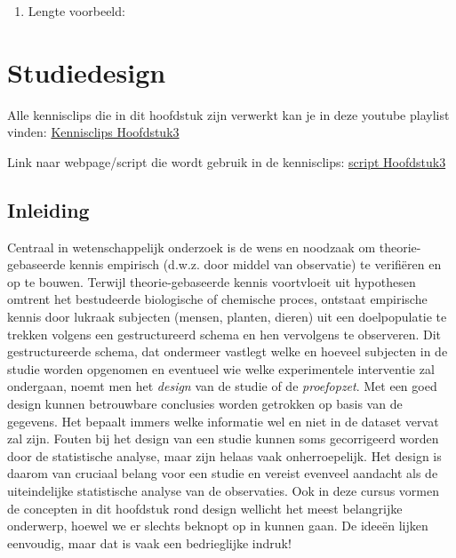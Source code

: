 \documentclass[
  dutch,
  letterpaper,
  12pt]{book}
\providecommand{\tightlist}{%
  \setlength{\itemsep}{0pt}\setlength{\parskip}{0pt}}
\theoremstyle{definition}
\theoremstyle{definition}
\theoremstyle{definition}
\theoremstyle{remark}
\begin{document}
\begin{enumerate}
\def\labelenumi{\arabic{enumi}.}
\setcounter{enumi}{1}
\tightlist
\item
  Lengte voorbeeld:
\end{enumerate}


\chapter{Studiedesign}\label{sec-chap-design}

Alle kennisclips die in dit hoofdstuk zijn verwerkt kan je in deze
youtube playlist vinden:
\href{https://www.youtube.com/playlist?list=PLZH1hP8_LbJL1GjhnpEDlx78OJ6qUzSix}{Kennisclips
Hoofdstuk3}

Link naar webpage/script die wordt gebruik in de kennisclips:
\href{https://statomics.github.io/sbc/rmd/03-experimentalDesign.html}{script
Hoofdstuk3}

\section{Inleiding}\label{inleiding-2}

Centraal in wetenschappelijk onderzoek is de wens en noodzaak om
theorie-gebaseerde kennis empirisch (d.w.z. door middel van observatie)
te verifiëren en op te bouwen. Terwijl theorie-gebaseerde kennis
voortvloeit uit hypothesen omtrent het bestudeerde biologische of
chemische proces, ontstaat empirische kennis door lukraak subjecten
(mensen, planten, dieren) uit een doelpopulatie te trekken volgens een
gestructureerd schema en hen vervolgens te observeren. Dit
gestructureerde schema, dat ondermeer vastlegt welke en hoeveel
subjecten in de studie worden opgenomen en eventueel wie welke
experimentele interventie zal ondergaan, noemt men het \emph{design} van
de studie of de \emph{proefopzet}. Met een goed design kunnen
betrouwbare conclusies worden getrokken op basis van de gegevens. Het
bepaalt immers welke informatie wel en niet in de dataset vervat zal
zijn. Fouten bij het design van een studie kunnen soms gecorrigeerd
worden door de statistische analyse, maar zijn helaas vaak
onherroepelijk. Het design is daarom van cruciaal belang voor een studie
en vereist evenveel aandacht als de uiteindelijke statistische analyse
van de observaties. Ook in deze cursus vormen de concepten in dit
hoofdstuk rond design wellicht het meest belangrijke onderwerp, hoewel
we er slechts beknopt op in kunnen gaan. De ideeën lijken eenvoudig,
maar dat is vaak een bedrieglijke indruk!
\end{document}
